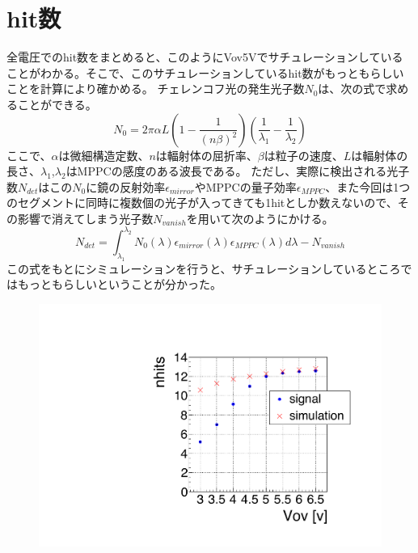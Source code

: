 \documentclass[uplatex, titlepage, dvipdfmx, 12pt, a4paper]{jsreport}
\begin{document}
  \section{hit数}
    全電圧でのhit数をまとめると、このようにVov5Vでサチュレーションしていることがわかる。そこで、このサチュレーションしているhit数がもっともらしいことを計算により確かめる。
    チェレンコフ光の発生光子数$N_{0}$は、次の式で求めることができる。
    \begin{equation}
        N_{0} = 2 \pi \alpha L  \left(1 - \frac{1}{(n\beta)^2}\right) \left(\frac{1}{\lambda_{1}} - \frac{1}{\lambda_{2}}\right)
    \end{equation}
    ここで、$\alpha$は微細構造定数、$n$は輻射体の屈折率、$\beta$は粒子の速度、$L$は輻射体の長さ、$\lambda_{1}$,$\lambda_{2}$はMPPCの感度のある波長である。
    ただし、実際に検出される光子数$N_{det}$はこの$N_{0}$に鏡の反射効率$\epsilon_{mirror}$やMPPCの量子効率$\epsilon_{MPPC}$、また今回は1つのセグメントに同時に複数個の光子が入ってきても1hitとしか数えないので、その影響で消えてしまう光子数$N_{vanish}$を用いて次のようにかける。
    \begin{equation}
        N_{det} = \int^{\lambda_2}_{\lambda_1} N_{0}\left(\lambda\right) \epsilon_{mirror}\left(\lambda\right) \epsilon_{MPPC}\left(\lambda\right) d\lambda - N_{vanish}
    \end{equation}
    この式をもとにシミュレーションを行うと、サチュレーションしているところではもっともらしいということが分かった。
    \begin{figure}[h]
      \begin{center} 
        \includegraphics[scale=0.5, clip]{image/hit_simulation.pdf}
        \caption{} 
        \label{fig:nhits} 
      \end{center}
    \end{figure}
\end{document}
